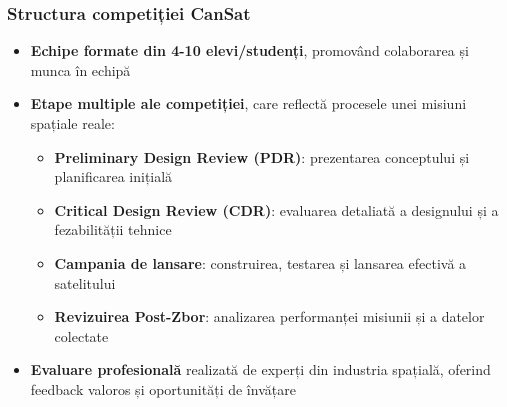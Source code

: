 
\begin{frame}
\frametitle{Structura competiției CanSat}
    {
        \begin{itemize}
        \item \textbf{Echipe formate din 4-10 elevi/studenți}, promovând colaborarea și munca în echipă
        \item \textbf{Etape multiple ale competiției}, care reflectă procesele unei misiuni spațiale reale:
        \begin{itemize}
            \item \textbf{Preliminary Design Review (PDR)}: prezentarea conceptului și planificarea inițială
            \item \textbf{Critical Design Review (CDR)}: evaluarea detaliată a designului și a fezabilității tehnice
            \item \textbf{Campania de lansare}: construirea, testarea și lansarea efectivă a satelitului
            \item \textbf{Revizuirea Post-Zbor}: analizarea performanței misiunii și a datelor colectate
        \end{itemize}
        \item \textbf{Evaluare profesională} realizată de experți din industria spațială, oferind feedback valoros și oportunități de învățare
    \end{itemize}
    }
\end{frame}